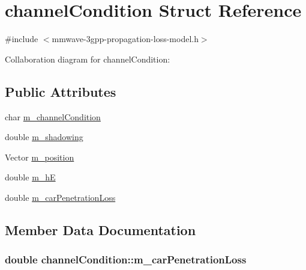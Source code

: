 \hypertarget{structchannelCondition}{}\section{channel\+Condition Struct Reference}
\label{structchannelCondition}


{\ttfamily \#include $<$mmwave-\/3gpp-\/propagation-\/loss-\/model.\+h$>$}



Collaboration diagram for channel\+Condition\+:
\subsection*{Public Attributes}
\begin{DoxyCompactItemize}
\item 
char \hyperlink{structchannelCondition_a1fbbec1a89c5da0961efaca304ade4d1}{m\+\_\+channel\+Condition}
\item 
double \hyperlink{structchannelCondition_abf42a510bc41e8eb84c96f9b47cc8f47}{m\+\_\+shadowing}
\item 
Vector \hyperlink{structchannelCondition_a24eb519106a6796f4f2bebcd9ea2fc40}{m\+\_\+position}
\item 
double \hyperlink{structchannelCondition_a6d2cc3deb0ce073a2b9a4d213e869985}{m\+\_\+hE}
\item 
double \hyperlink{structchannelCondition_a3e9edf8d18ffacdfb4237471a6419627}{m\+\_\+car\+Penetration\+Loss}
\end{DoxyCompactItemize}


\subsection{Member Data Documentation}
\subsubsection[{\texorpdfstring{m\+\_\+car\+Penetration\+Loss}{m_carPenetrationLoss}}]{\setlength{\rightskip}{0pt plus 5cm}double channel\+Condition\+::m\+\_\+car\+Penetration\+Loss}\hypertarget{structchannelCondition_a3e9edf8d18ffacdfb4237471a6419627}{}\label{structchannelCondition_a3e9edf8d18ffacdfb4237471a6419627}
